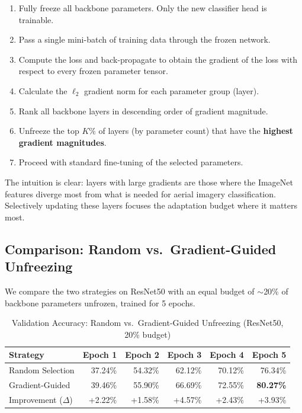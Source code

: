 \documentclass[12pt,a4paper]{article}
\begin{document}
\begin{enumerate}[nosep]
    \item Fully freeze all backbone parameters. Only the new classifier head is trainable.
    \item Pass a single mini-batch of training data through the frozen network.
    \item Compute the loss and back-propagate to obtain the gradient of the loss with respect to every frozen parameter tensor.
    \item Calculate the $\ell_2$ gradient norm for each parameter group (layer).
    \item Rank all backbone layers in descending order of gradient magnitude.
    \item Unfreeze the top $K\%$ of layers (by parameter count) that have the \textbf{highest gradient magnitudes}.
    \item Proceed with standard fine-tuning of the selected parameters.
\end{enumerate}

The intuition is clear: layers with large gradients are those where the ImageNet features diverge most from what is needed for aerial imagery classification. Selectively updating these layers focuses the adaptation budget where it matters most.

\subsection{Comparison: Random vs.\ Gradient-Guided Unfreezing}

We compare the two strategies on ResNet50 with an equal budget of $\sim$20\% of backbone parameters unfrozen, trained for 5 epochs.

\begin{table}[H]
    \centering
    \caption{Validation Accuracy: Random vs.\ Gradient-Guided Unfreezing (ResNet50, 20\% budget)}
    \begin{tabular}{lrrrrr}
        \toprule
        Strategy & Epoch 1 & Epoch 2 & Epoch 3 & Epoch 4 & Epoch 5 \\
        \midrule
        Random Selection      & 37.24\% & 54.32\% & 62.12\% & 70.12\% & 76.34\% \\
        Gradient-Guided       & 39.46\% & 55.90\% & 66.69\% & 72.55\% & \textbf{80.27\%} \\
        \midrule
        Improvement ($\Delta$) & +2.22\% & +1.58\% & +4.57\% & +2.43\% & +3.93\% \\
        \bottomrule
    \end{tabular}
\end{table}
\end{document}
